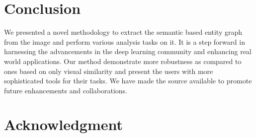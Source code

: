 \documentclass[conference]{IEEEtran}
\begin{document}
%





\section{Conclusion}
We presented a novel methodology to extract the semantic based entity graph from the image and perform various analysis tasks on it. It is a step forward in harnessing the advancements in the deep learning community and enhancing real world applications. Our method demonstrate more robustness as compared to ones based on only visual similarity and present the users with more sophisticated tools for their tasks. We have made the source available to promote future enhancements and collaborations.




\section*{Acknowledgment}
\end{document}
